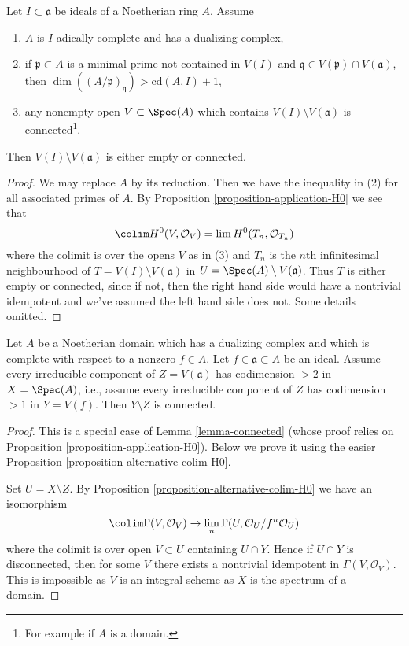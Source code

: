 \begin{lemma}
\label{lemma-connected}
Let $I \subset \mathfrak a$ be ideals of a Noetherian ring $A$.
Assume
\begin{enumerate}
\item $A$ is $I$-adically complete and has a dualizing complex,
\item if $\mathfrak p \subset A$ is a minimal prime not contained
in $V(I)$ and $\mathfrak q \in V(\mathfrak p) \cap V(\mathfrak a)$, then
$\dim((A/\mathfrak p)_\mathfrak q) > \text{cd}(A, I) + 1$,
\item any nonempty open $V \subset \Spec(A)$ which contains
$V(I) \setminus V(\mathfrak a)$ is connected\footnote{For example
if $A$ is a domain.}.
\end{enumerate}
Then $V(I) \setminus V(\mathfrak a)$ is either empty or connected.
\end{lemma}

\begin{proof}
We may replace $A$ by its reduction. Then we have the inequality
in (2) for all associated primes of $A$. By
Proposition \ref{proposition-application-H0} we see that
$$
\colim H^0(V, \mathcal{O}_V) = \lim H^0(T_n, \mathcal{O}_{T_n})
$$
where the colimit is over the opens $V$ as in (3) and $T_n$ is the
$n$th infinitesimal neighbourhood of $T = V(I) \setminus V(\mathfrak a)$
in $U = \Spec(A) \setminus V(\mathfrak a)$. Thus $T$ is either empty
or connected, since if not, then the right hand side would have a
nontrivial idempotent and we've assumed the left hand side does not.
Some details omitted.
\end{proof}

\begin{lemma}
\label{lemma-H0}
Let $A$ be a Noetherian domain which has a dualizing complex
and which is complete with respect to a nonzero $f \in A$.
Let $f \in \mathfrak a \subset A$ be an ideal.
Assume every irreducible component of $Z = V(\mathfrak a)$
has codimension $> 2$ in $X = \Spec(A)$, i.e., assume every
irreducible component of $Z$ has codimension $> 1$ in $Y = V(f)$.
Then $Y \setminus Z$ is connected.
\end{lemma}

\begin{proof}
This is a special case of Lemma \ref{lemma-connected} (whose proof
relies on Proposition \ref{proposition-application-H0}). Below we
prove it using the easier Proposition \ref{proposition-alternative-colim-H0}.

\medskip\noindent
Set $U = X \setminus Z$. By Proposition \ref{proposition-alternative-colim-H0}
we have an isomorphism
$$
\colim \Gamma(V, \mathcal{O}_V) \to
\lim_n \Gamma(U, \mathcal{O}_U/f^n \mathcal{O}_U)
$$
where the colimit is over open $V \subset U$ containing $U \cap Y$.
Hence if $U \cap Y$ is disconnected, then for some $V$ there exists
a nontrivial idempotent in $\Gamma(V, \mathcal{O}_V)$. This is impossible
as $V$ is an integral scheme as $X$ is the spectrum of a domain.
\end{proof}






